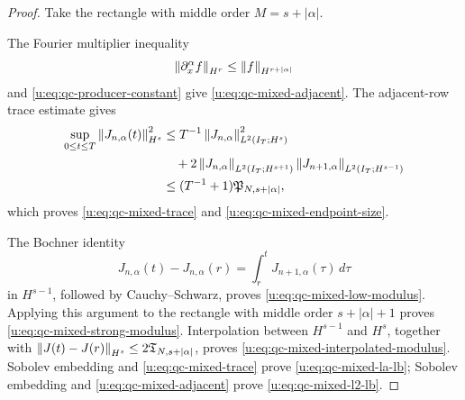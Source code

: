 \begin{proof}
Take the rectangle with middle order \(M=s+|\alpha|\).
\begin{samepage}
The Fourier
multiplier inequality
\[
 \left\lVert \partial_x^\alpha f\right\rVert_{H^r}
 \le \left\lVert f\right\rVert_{H^{r+|\alpha|}}
\]
and \eqref{u:eq:qc-producer-constant} give
\eqref{u:eq:qc-mixed-adjacent}.
The adjacent-row trace estimate gives
\begin{align*}
 \sup_{0\le t\le T}\left\lVert J_{n,\alpha}(t)\right\rVert_{H^s}^2
 &\le T^{-1}\left\lVert J_{n,\alpha}\right\rVert_{L^2(I_T;H^s)}^2\\
 &\quad+2\left\lVert J_{n,\alpha}\right\rVert_{L^2(I_T;H^{s+1})}
          \left\lVert J_{n+1,\alpha}\right\rVert_{L^2(I_T;H^{s-1})}\\
 &\le (T^{-1}+1)\mathfrak P_{N,s+|\alpha|},
\end{align*}
which proves \eqref{u:eq:qc-mixed-trace} and
\eqref{u:eq:qc-mixed-endpoint-size}.
\par
\end{samepage}
The Bochner identity
\[
 J_{n,\alpha}(t)-J_{n,\alpha}(r)
 =\int_r^tJ_{n+1,\alpha}(\tau)\,d\tau
\]
in \(H^{s-1}\), followed by Cauchy--Schwarz, proves
\eqref{u:eq:qc-mixed-low-modulus}.  Applying this argument to the rectangle
with middle order \(s+|\alpha|+1\) proves
\eqref{u:eq:qc-mixed-strong-modulus}.  Interpolation between
\(H^{s-1}\) and \(H^s\), together with
\(\left\lVert J(t)-J(r)\right\rVert_{H^s}\le2\mathfrak T_{N,s+|\alpha|}\), proves
\eqref{u:eq:qc-mixed-interpolated-modulus}.  Sobolev embedding and
\eqref{u:eq:qc-mixed-trace} prove \eqref{u:eq:qc-mixed-la-lb}; Sobolev embedding
and \eqref{u:eq:qc-mixed-adjacent} prove \eqref{u:eq:qc-mixed-l2-lb}.
\end{proof}


